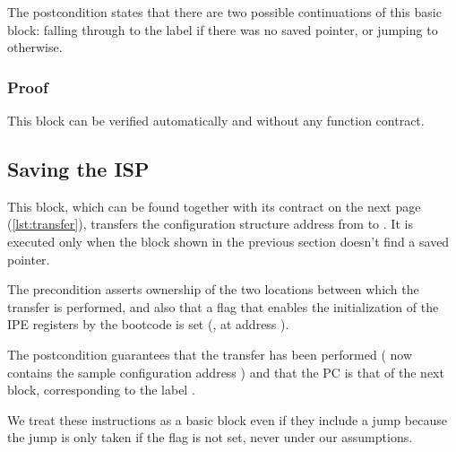 \pagebreak

The postcondition states that there are two possible continuations of this basic block: falling through to the  label if there was no  saved pointer, or jumping to  otherwise.

\subsubsection{Proof}

This block can be verified automatically and without %
any \usail function contract.

\subsection{Saving the ISP}

This block, which can be found together with its contract on the next page (\cref{lst:transfer}), transfers the configuration structure address from  to . %
It is executed only when the block shown in the previous section doesn't find a saved pointer.

The precondition asserts ownership of the two locations between which the transfer is performed, and also that a flag that enables the initialization of the IPE registers by the bootcode is set (, \ie {} at address ).

The postcondition guarantees that the transfer has been performed ( now contains the sample configuration address ) and that the PC is that of the next block, corresponding to the label .

We treat these instructions as a basic block even if they include a jump because the jump is only taken if the flag is not set, \ie never under our assumptions.


